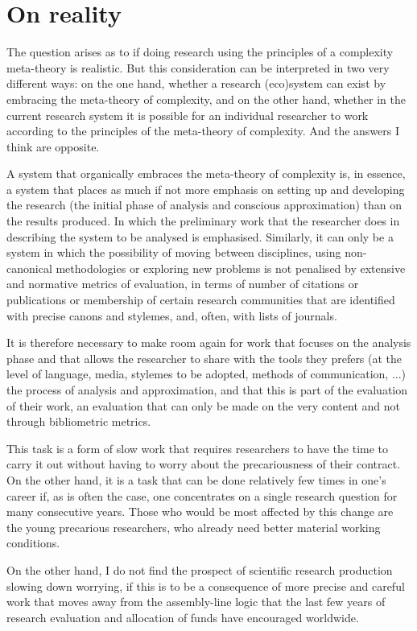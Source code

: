 \documentclass[a4paper, headings=standardclasses]{scrartcl}
\begin{document}
\section{On reality}
The question arises as to if doing research using the principles of a complexity meta-theory is realistic.
But this consideration can be interpreted in two very different ways: on the one hand, whether a research (eco)system can exist by embracing the meta-theory of complexity, and on the other hand, whether in the current research system it is possible for an individual researcher to work according to the principles of the meta-theory of complexity. And the answers I think are opposite.

A system that organically embraces the meta-theory of complexity is, in essence, a system that places as much if not more emphasis on setting up and developing the research (the initial phase of analysis and conscious approximation) than on the results produced. In which the preliminary work that the researcher does in describing the system to be analysed is emphasised.
Similarly, it can only be a system in which the possibility of moving between disciplines, using non-canonical methodologies or exploring new problems is not penalised by extensive and normative metrics of evaluation, in terms of number of citations or publications or membership of certain research communities that are identified with precise canons and stylemes, and, often, with lists of journals.

It is therefore necessary to make room again for work that focuses on the analysis phase and that allows the researcher to share with the tools they prefers (at the level of language, media, stylemes to be adopted, methods of communication, ...) the process of analysis and approximation, and that this is part of the evaluation of their work, an evaluation that can only be made on the very content and not through bibliometric metrics. 

This task is a form of slow work that requires researchers to have the time to carry it out without having to worry about the precariousness of their contract. On the other hand, it is a task that can be done relatively few times in one's career if, as is often the case, one concentrates on a single research question for many consecutive years.
Those who would be most affected by this change are the young precarious researchers, who already need better material working conditions.

On the other hand, I do not find the prospect of scientific research production slowing down worrying, if this is to be a consequence of more precise and careful work that moves away from the assembly-line logic that the last few years of research evaluation and allocation of funds have encouraged worldwide.
\end{document}
